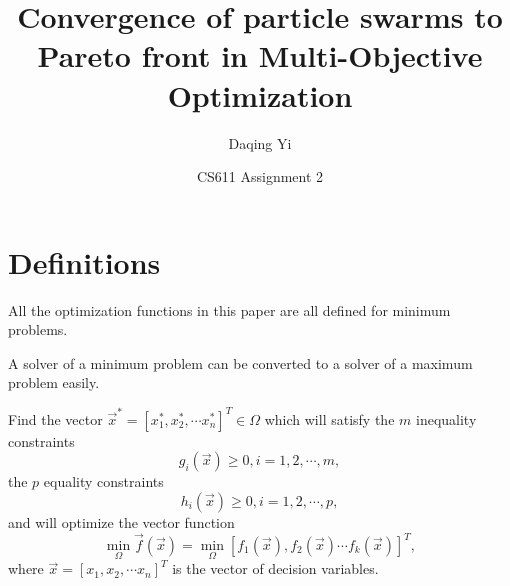 \documentclass[12pt]{article}
\begin{document}
\title{\textsf{Convergence of particle swarms to Pareto front in Multi-Objective Optimization}}
\author{\textsf{Daqing Yi}}
\date{\textsf{CS611 Assignment 2}}

\maketitle



\section{Definitions}

\begin{prop}
All the optimization functions in this paper are all defined for minimum problems.
\end{prop}
A solver of a minimum problem can be converted to a solver of a maximum problem easily.

\begin{mydef}
\label{def:multi_opt}
Find the vector $ \vec{x}^{*} = \left[ {x}_{1}^{*}, {x}_{2}^{*}, \cdots {x}_{n}^{*} \right]^{T} \in \Omega $ which will satisfy the $ m $ inequality constraints
\begin{equation}
\label{eq:mo_ineq_constraint}
g_{i}(\vec{x}) \geq 0, i = 1, 2, \cdots , m, 
\end{equation}
the $ p $ equality constraints
\begin{equation}
\label{eq:mo_eq_constraint}
h_{i}(\vec{x}) \geq 0, i = 1, 2, \cdots , p, 
\end{equation}
and will optimize the vector function
\begin{equation}
\label{eq:mo_obj}
\min_{\Omega} \vec{f}(\vec{x}) = \min_{\Omega} \left[ f_{1}(\vec{x}), f_{2}(\vec{x}) \cdots f_{k}(\vec{x}) \right]^{T},
\end{equation}
where $ \vec{x} = \left[ x_{1}, x_{2}, \cdots x_{n} \right]^{T} $ is the vector of decision variables.
\end{mydef}
\end{document}
